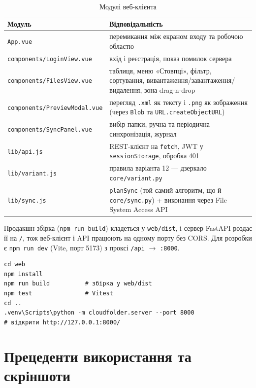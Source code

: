 \documentclass[12pt,a4paper]{article}
\begin{document}
{\small
\begin{longtable}{@{}p{5cm}p{11cm}@{}}
\caption{Модулі веб-клієнта}\\
\toprule
\textbf{Модуль} & \textbf{Відповідальність} \\
\midrule
\endhead
\texttt{App.vue} & перемикання між екраном входу та робочою областю \\ \midrule
\texttt{components/\allowbreak{}LoginView.vue} & вхід і реєстрація, показ помилок сервера \\ \midrule
\texttt{components/\allowbreak{}FilesView.vue} & таблиця, меню «Стовпці», фільтр, сортування, вивантаження/завантаження/видалення, зона drag-n-drop \\ \midrule
\texttt{components/\allowbreak{}PreviewModal.vue} & перегляд \texttt{.xml} як тексту і \texttt{.png} як зображення (через \texttt{Blob} та \texttt{URL.createObjectURL}) \\ \midrule
\texttt{components/\allowbreak{}SyncPanel.vue} & вибір папки, ручна та періодична синхронізація, журнал \\ \midrule
\texttt{lib/\allowbreak{}api.js} & REST-клієнт на \texttt{fetch}, JWT у \texttt{sessionStorage}, обробка 401 \\ \midrule
\texttt{lib/\allowbreak{}variant.js} & правила варіанта 12 --- дзеркало \texttt{core/\allowbreak{}variant.py} \\ \midrule
\texttt{lib/\allowbreak{}sync.js} & \texttt{planSync} (той самий алгоритм, що й \texttt{core/\allowbreak{}sync.py}) + виконання через File System Access API \\ \midrule
\bottomrule
\end{longtable}}

Продакшн-збірка (\texttt{npm run build}) кладеться у \texttt{web/\allowbreak{}dist}, і сервер FastAPI роздає її на \texttt{/\allowbreak{}}, тож веб-клієнт і API працюють на одному порту без CORS. Для розробки є \texttt{npm run dev} (Vite, порт 5173) з проксі \texttt{/\allowbreak{}api} $\to$ \texttt{:8000}.

\begin{Verbatim}[fontsize=\small,frame=single]
cd web
npm install
npm run build          # збірка у web/dist
npm test               # Vitest
cd ..
.venv\Scripts\python -m cloudfolder.server --port 8000
# відкрити http://127.0.0.1:8000/
\end{Verbatim}


\section{Прецеденти використання та скріншоти}
\end{document}
